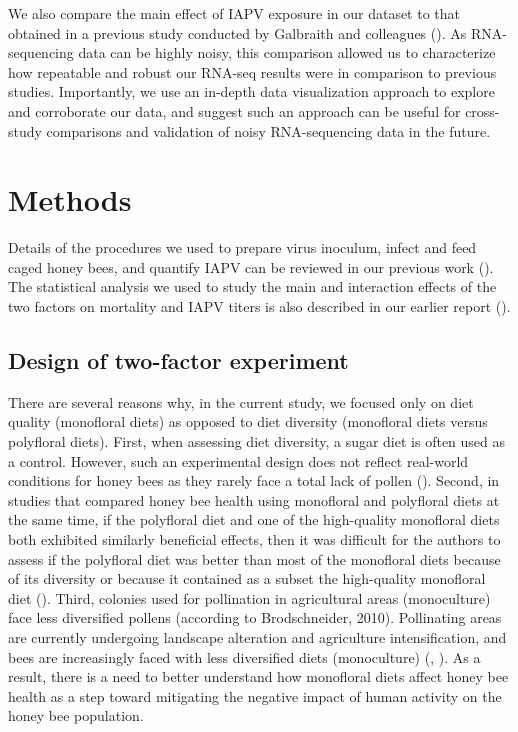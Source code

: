 \documentclass[11pt,a4paper,oldfontcommands,openany]{memoir}
\numberwithin{equation}{section} %
\begin{document}
We also compare the main effect of IAPV exposure in our dataset to that obtained in a previous study conducted by Galbraith and colleagues (\citealt{galbraith}). As RNA-sequencing data can be highly noisy, this comparison allowed us to characterize how repeatable and robust our RNA-seq results were in comparison to previous studies. Importantly, we use an in-depth data visualization approach to explore and corroborate our data, and suggest such an approach can be useful for cross-study comparisons and validation of noisy RNA-sequencing data in the future.

\section{Methods}

Details of the procedures we used to prepare virus inoculum, infect and feed caged honey bees, and quantify IAPV can be reviewed in our previous work (\citealt{adamInt}). The statistical analysis we used to study the main and interaction effects of the two factors on mortality and IAPV titers is also described in our earlier report (\citealt{adamInt}).

\subsection{Design of two-factor experiment}

There are several reasons why, in the current study, we focused only on diet quality (monofloral diets) as opposed to diet diversity (monofloral diets versus polyfloral diets). First, when assessing diet diversity, a sugar diet is often used as a control. However, such an experimental design does not reflect real-world conditions for honey bees as they rarely face a total lack of pollen (\citealt{DiPasquale}). Second, in studies that compared honey bee health using monofloral and polyfloral diets at the same time, if the polyfloral diet and one of the high-quality monofloral diets both exhibited similarly beneficial effects, then it was difficult for the authors to assess if the polyfloral diet was better than most of the monofloral diets because of its diversity or because it contained as a subset the high-quality monofloral diet (\citealt{DiPasquale}). Third, colonies used for pollination in agricultural areas (monoculture) face less diversified pollens (according to Brodschneider, 2010). Pollinating areas are currently undergoing landscape alteration and agriculture intensification, and bees are increasingly faced with less diversified diets (monoculture) (\citealt{landscape1}, \citealt{brodschneider}). As a result, there is a need to better understand how monofloral diets affect honey bee health as a step toward mitigating the negative impact of human activity on the honey bee population.
\end{document}

